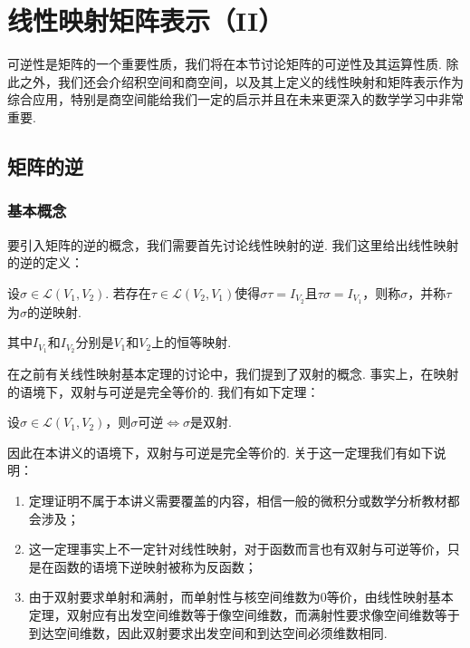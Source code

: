 \chapter{线性映射矩阵表示（II）}

可逆性是矩阵的一个重要性质，我们将在本节讨论矩阵的可逆性及其运算性质. 除此之外，我们还会介绍积空间和商空间，以及其上定义的线性映射和矩阵表示作为综合应用，特别是商空间能给我们一定的启示并且在未来更深入的数学学习中非常重要.

\section{矩阵的逆}

\subsection{基本概念}

要引入矩阵的逆的概念，我们需要首先讨论线性映射的逆. 我们这里给出线性映射的逆的定义：
\begin{definition}[线性映射的逆] \label{def:8:可逆映射} 
    设$\sigma \in \mathcal{L}(V_1,V_2)$. 若存在$\tau \in \mathcal{L}(V_2,V_1)$使得$\sigma \tau = I_{V_2}$且$\tau \sigma = I_{V_1}$，则称$\sigma$，并称$\tau$为$\sigma$的逆映射.
\end{definition}
其中$I_{V_1}$和$I_{V_2}$分别是$V_1$和$V_2$上的恒等映射.

在之前有关线性映射基本定理的讨论中，我们提到了双射的概念. 事实上，在映射的语境下，双射与可逆是完全等价的. 我们有如下定理：
\begin{theorem}
    设$\sigma \in \mathcal{L}(V_1,V_2)$，则$\sigma$可逆$\iff \sigma$是双射.
\end{theorem}

因此在本讲义的语境下，双射与可逆是完全等价的. 关于这一定理我们有如下说明：
\begin{enumerate}
    \item 定理证明不属于本讲义需要覆盖的内容，相信一般的微积分或数学分析教材都会涉及；

    \item 这一定理事实上不一定针对线性映射，对于函数而言也有双射与可逆等价，只是在函数的语境下逆映射被称为反函数；

    \item 由于双射要求单射和满射，而单射性与核空间维数为0等价，由线性映射基本定理，双射应有出发空间维数等于像空间维数，而满射性要求像空间维数等于到达空间维数，因此双射要求出发空间和到达空间必须维数相同.
\end{enumerate}

